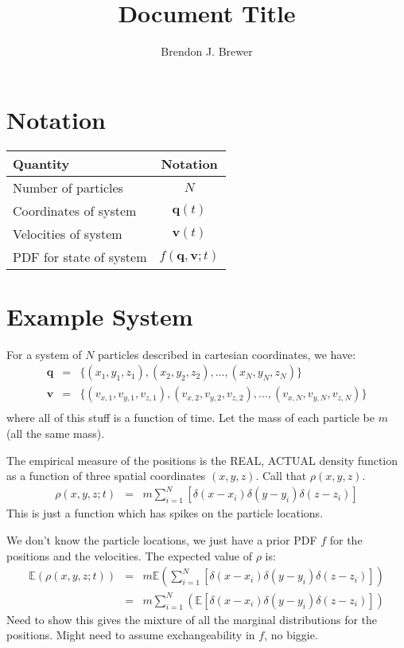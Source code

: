 \documentclass[a4paper, 11pt]{article}
\title{Document Title}
\author{Brendon J. Brewer}
\begin{document}
\maketitle

\section{Notation}

\begin{table}[h!]
\begin{center}
\begin{tabular}{|l|c|}
\hline
{\bf Quantity} & {\bf Notation}\\
\hline
Number of particles & $N$\\
Coordinates of system & $\mathbf{q}(t)$\\
Velocities of system  & $\mathbf{v}(t)$\\
PDF for state of system & $f(\mathbf{q}, \mathbf{v}; t)$\\
\hline
\end{tabular}
\end{center}
\end{table}

\section{Example System}

For a system of $N$ particles described in cartesian coordinates, we have:
\begin{eqnarray}
\mathbf{q} &=& \{(x_1, y_1, z_1), (x_2, y_2, z_2), ..., (x_N, y_N, z_N)\}\\
\mathbf{v} &=& \{(v_{x,1}, v_{y,1}, v_{z,1}), (v_{x,2}, v_{y,2}, v_{z,2}), ..., (v_{x,N}, v_{y,N}, v_{z,N})\}\\
\end{eqnarray}
where all of this stuff is a function of time. Let the mass of each particle be
$m$ (all the same mass).

The empirical measure of the positions is the REAL, ACTUAL density function
as a function of three spatial coordinates $(x, y, z)$. Call that $\rho(x,y,z)$.
\begin{eqnarray}
\rho(x, y, z; t) &=& m \sum_{i=1}^N\left[
\delta(x - x_i)\delta(y - y_i)\delta(z - z_i)
\right]
\end{eqnarray}
This is just a function which has spikes on the particle locations.

We don't know the particle locations, we just have a prior PDF $f$ for the
positions and the velocities. The expected value of $\rho$ is:
\begin{eqnarray}
\mathds{E}\left(\rho(x, y, z; t)\right) &=& m
\mathds{E}\left(
\sum_{i=1}^N\left[
\delta(x - x_i)\delta(y - y_i)\delta(z - z_i)
\right]
\right)\\
&=&
m
\sum_{i=1}^N\left(\mathds{E}
\left[
\delta(x - x_i)\delta(y - y_i)\delta(z - z_i)
\right]
\right)
\end{eqnarray}
Need to show this gives the mixture of all the marginal distributions for the
positions. Might need to assume exchangeability in $f$, no biggie.
\end{document}
